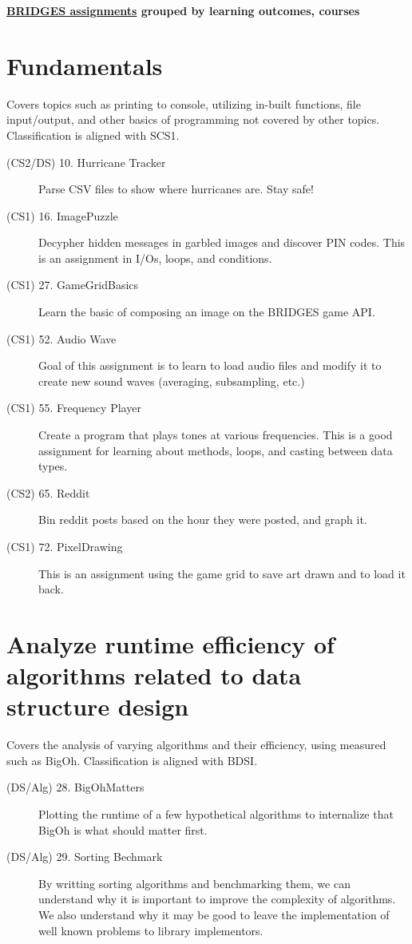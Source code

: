 \documentclass[10pt, onecoulmn]{article}
\begin{document}
\begin{center}
\textbf{\Large \href{https://bridgesuncc.github.io/newassignments.html}{\color{blue}BRIDGES assignments} grouped by learning outcomes, courses}\\
\end{center}
\section{Fundamentals}
Covers topics such as printing to console, utilizing in-built functions, file input/output, and other basics of programming not covered by other topics. Classification is aligned with SCS1.
\begin{description}
	\item[(CS2/DS) 10. Hurricane Tracker] Parse CSV files to show where hurricanes are. Stay safe!
	\item[(CS1) 16. ImagePuzzle] Decypher hidden messages in garbled images and discover PIN codes. This is an assignment in I/Os, loops, and conditions.
	\item[(CS1) 27. GameGridBasics] Learn the basic of composing an image on the BRIDGES game API.
	\item[(CS1) 52. Audio Wave] Goal of this assignment is to learn to load audio files and modify it to create new sound waves (averaging, subsampling, etc.)
	\item[(CS1) 55. Frequency Player] Create a program that plays tones at various frequencies. This is a good assignment for learning about methods, loops, and casting between data types.
	\item[(CS2) 65. Reddit] Bin reddit posts based on the hour they were posted, and graph it.
	\item[(CS1) 72. PixelDrawing] This is an assignment using the game grid to save art drawn and to load it back.
\end{description}
\section{Analyze runtime efficiency of algorithms related to data structure design}
Covers the analysis of varying algorithms and their efficiency, using measured such as BigOh. Classification is aligned with BDSI.
\begin{description}
	\item[(DS/Alg) 28. BigOhMatters] Plotting the runtime of a few hypothetical algorithms to internalize that BigOh is what should matter first.
	\item[(DS/Alg) 29. Sorting Bechmark] By writting sorting algorithms and benchmarking them, we can understand why it is important to improve the complexity of algorithms. We also understand why it may be good to leave the implementation of well known problems to library implementors.
\end{description}
\end{document}
